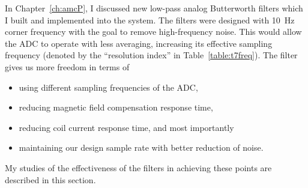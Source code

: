
In Chapter~\ref{ch:amcP}, I discussed new low-pass analog Butterworth
filters which I built and implemented into the system.  The filters
were designed with 10~Hz corner frequency with the goal to remove
high-frequency noise.  This would allow the ADC to operate with less
averaging, increasing its effective sampling frequency (denoted by the
``resolution index'' in Table~\ref{table:t7freq}).  The filter gives
us more freedom in terms of
\begin{itemize}
    \item using different sampling frequencies of the ADC,
    \item reducing magnetic field compensation response time,
    \item reducing coil current response time, and most importantly
    \item maintaining our design sample rate with better reduction of noise.
\end{itemize}
My studies of the effectiveness of the filters in achieving these
points are described in this section.





